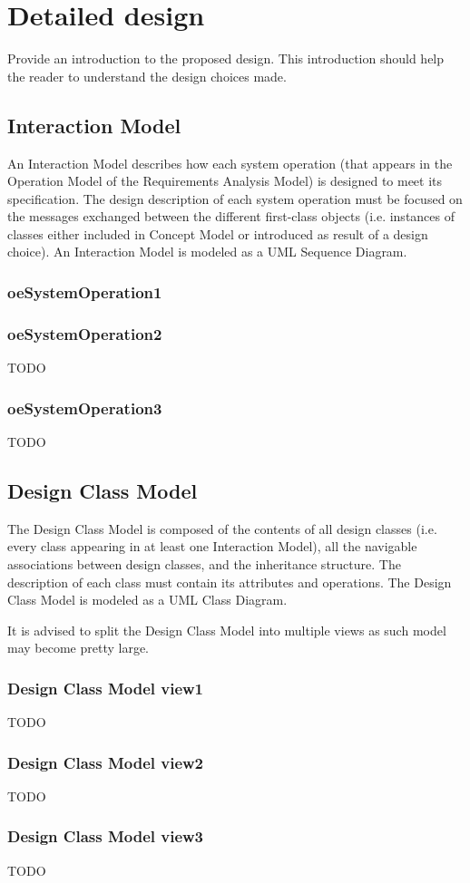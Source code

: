 \chapter{Detailed design}
\label{chap:detDesign}


Provide an introduction to the proposed design. This introduction should help
the reader to understand the design choices made.


\section{Interaction Model}
An Interaction Model describes how each \gls{system operation} (that appears in the
Operation Model of the \msrmessir Requirements Analysis Model) is designed to meet
its specification. The design description of each system operation must be
focused on the messages exchanged between the different first-class objects
(i.e. instances of classes either included in Concept Model or introduced as
result of a design choice). An Interaction Model is modeled as a UML Sequence
Diagram.


\subsection{oeSystemOperation1}



\subsection{oeSystemOperation2}
TODO


\subsection{oeSystemOperation3}
TODO



\section{Design Class Model}
The Design Class Model is composed of the contents of all design classes (i.e.
every class appearing in at least one Interaction Model), all the navigable associations between design
classes, and the inheritance structure. The description of each class must
contain its attributes and operations. The Design Class Model is modeled as a
UML Class Diagram. 

It is advised to split the Design Class Model into multiple views as such model
may become pretty large. 
	

\subsection{Design Class Model view1}
TODO


\subsection{Design Class Model view2}
TODO



\subsection{Design Class Model view3}
TODO